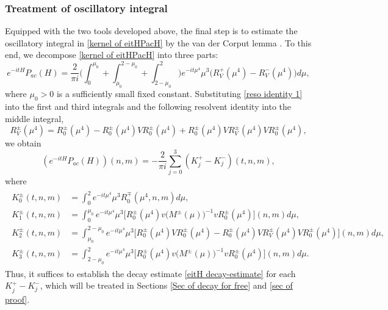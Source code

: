 \documentclass[reqno, 11pt]{amsart}
\numberwithin{equation}{section}
\begin{document}
\subsubsection{Treatment of oscillatory integral}
Equipped with the two tools developed above, the final step is to estimate the oscillatory integral in \eqref{kernel of eitHPacH} by the van der Corput lemma \cite[pp.~332--334]{Ste93}. To this end, we decompose \eqref{kernel of eitHPacH} into three parts: 
\begin{equation*}%
e^{-itH}P_{ac}(H)=\frac{2}{\pi i}\Big(\int_{0}^{\mu_0}+\int_{\mu_0}^{2-\mu_0}+\int_{2-\mu_0}^{2}\Big)e^{-it\mu^4}\mu^3\big(R^{+}_V(\mu^4)-R^{-}_V(\mu^4)\big)d\mu,
\end{equation*}
where $\mu_0>0$ is a sufficiently small fixed constant. Substituting \eqref{reso identity 1} into the first and third integrals and the following resolvent identity into the middle integral, 
\begin{equation*}%
R^{\pm}_V(\mu^4)=R^{\pm}_{0}(\mu^4)-R^{\pm}_{0}(\mu^4)VR^{\pm}_{0}(\mu^4)+R^{\pm}_{0}(\mu^4)VR^{\pm}_V(\mu^4)VR^{\pm}_{0}(\mu^4),
\end{equation*}
we obtain
\begin{equation*}%
(e^{-itH}P_{ac}(H))(n,m)=-\frac{2}{\pi i}\sum\limits_{j=0}^{3}(K^{+}_{j}-K^{-}_{j})(t,n,m),
\end{equation*}
where
\begin{align}\label{kernels of Ki}
\begin{split}
K^{\pm}_{0}(t,n,m)&=\int_{0}^{2}e^{-it\mu^4}\mu^3R^{\mp}_0(\mu^4,n,m)d\mu,\\
K^{\pm}_{1}(t,n,m)&=\int_{0}^{\mu_0}e^{-it\mu^4}\mu^3\big[R^{\pm}_0(\mu^4)v\big(M^{\pm}(\mu)\big)^{-1}vR^{\pm}_0(\mu^4)\big](n,m)d\mu,\\
K^{\pm}_{2}(t,n,m)&=\int_{\mu_0}^{2-\mu_0}e^{-it\mu^4}\mu^3\big[R^{\pm}_0(\mu^4)VR^{\pm}_0(\mu^4)-R^{\pm}_0(\mu^4)VR^{\pm}_V(\mu^4)VR^{\pm}_0(\mu^4)\big](n,m)d\mu,\\
K^{\pm}_{3}(t,n,m)&=\int_{2-\mu_0}^{2}e^{-it\mu^4}\mu^3\big[R^{\pm}_0(\mu^4)v\big(M^{\pm}(\mu)\big)^{-1}vR^{\pm}_0(\mu^4)\big](n,m)d\mu.
\end{split}
\end{align}
Thus, it suffices to establish the decay estimate \eqref{eitH decay-estimate} for each $K_j^+-K_j^-$, which will be treated in Sections \ref{Sec of decay for free} and \ref{sec of proof}.
\end{document}
